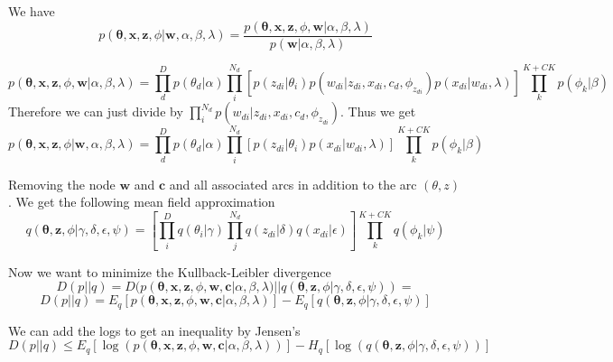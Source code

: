 \documentclass[12pt]{article}
\begin{document}
We have 
$$
p(\mathbf{\theta},\mathbf{x},\mathbf{z},\phi | \mathbf{w},\alpha,\beta,\lambda) = \frac{p(\mathbf{\theta},\mathbf{x},\mathbf{z},\phi,\mathbf{w}|\alpha,\beta,\lambda)}{p(\mathbf{w}|\alpha,\beta,\lambda)}
$$

$$
p(\mathbf{\theta},\mathbf{x},\mathbf{z},\phi,\mathbf{w} |\alpha,\beta,\lambda) = \prod_d^D p(\theta_d|\alpha) \prod_i^{N_d} \left[ p(z_{di}|\theta_i) p(w_{di} | z_{di},x_{di},c_{d},\phi_{z_{di}})p(x_{di}|w_{di},\lambda) \right] \prod_k^{K + CK} p(\phi_k|\beta) 
$$
Therefore we can just divide by $\prod_i^{N_d} p(w_{di} | z_{di},x_{di},c_{d},\phi_{z_{di}})$. Thus we get
$$
p(\mathbf{\theta},\mathbf{x},\mathbf{z},\phi |\mathbf{w} ,\alpha,\beta,\lambda) = \prod_d^D p(\theta_d|\alpha) \prod_i^{N_d} \left[ p(z_{di}|\theta_i) p(x_{di}|w_{di},\lambda) \right] \prod_k^{K + CK} p(\phi_k|\beta) 
$$

Removing the node $\mathbf{w}$  and $\mathbf{c}$ and all associated arcs in addition to the arc $(\theta,z)$. 
We get the following mean field approximation
$$
q(\mathbf{\theta},\mathbf{z},\phi|\gamma,\delta,\epsilon,\psi) = \left[\prod_i^D q(\theta_i|\gamma)\prod_j^{N_d} q(z_{di}|\delta) q(x_{di}|\epsilon)\right] \prod_k^{K + CK} q(\phi_k|\psi)
$$


Now we want to minimize the Kullback-Leibler divergence 
$$
D(p||q) = D(p(\mathbf{\theta},\mathbf{x},\mathbf{z},\phi,\mathbf{w},\mathbf{c} |\alpha,\beta,\lambda) || q(\mathbf{\theta},\mathbf{z},\phi|\gamma,\delta,\epsilon,\psi) ) =
$$
$$
D(p||q) = E_q\left[ p(\mathbf{\theta},\mathbf{x},\mathbf{z},\phi,\mathbf{w}, \mathbf{c} |\alpha,\beta,\lambda) \right] - E_q \left[ q(\mathbf{\theta},\mathbf{z},\phi|\gamma,\delta,\epsilon,\psi) \right]
$$

We can add the logs to get an inequality by Jensen's
$$
D(p||q) \leq E_q\left[\log( p(\mathbf{\theta},\mathbf{x},\mathbf{z},\phi,\mathbf{w},\mathbf{c} |\alpha,\beta,\lambda) )\right] - H_q\left[ \log(q(\mathbf{\theta},\mathbf{z},\phi|\gamma,\delta,\epsilon,\psi)) \right]
$$
\end{document}
